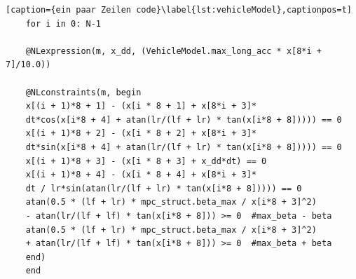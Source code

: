 \begin{lstlisting}
[caption={ein paar Zeilen code}\label{lst:vehicleModel},captionpos=t] 
    for i in 0: N-1
    
    @NLexpression(m, x_dd, (VehicleModel.max_long_acc * x[8*i + 7]/10.0))
    
    @NLconstraints(m, begin
    x[(i + 1)*8 + 1] - (x[i * 8 + 1] + x[8*i + 3]*
    dt*cos(x[i*8 + 4] + atan(lr/(lf + lr) * tan(x[i*8 + 8])))) == 0
    x[(i + 1)*8 + 2] - (x[i * 8 + 2] + x[8*i + 3]*
    dt*sin(x[i*8 + 4] + atan(lr/(lf + lr) * tan(x[i*8 + 8])))) == 0
    x[(i + 1)*8 + 3] - (x[i * 8 + 3] + x_dd*dt) == 0
    x[(i + 1)*8 + 4] - (x[i * 8 + 4] + x[8*i + 3]*
    dt / lr*sin(atan(lr/(lf + lr) * tan(x[i*8 + 8])))) == 0
    atan(0.5 * (lf + lr) * mpc_struct.beta_max / x[i*8 + 3]^2)
    - atan(lr/(lf + lf) * tan(x[i*8 + 8])) >= 0  #max_beta - beta
    atan(0.5 * (lf + lr) * mpc_struct.beta_max / x[i*8 + 3]^2)
    + atan(lr/(lf + lf) * tan(x[i*8 + 8])) >= 0  #max_beta + beta
    end)
    end
\end{lstlisting}





